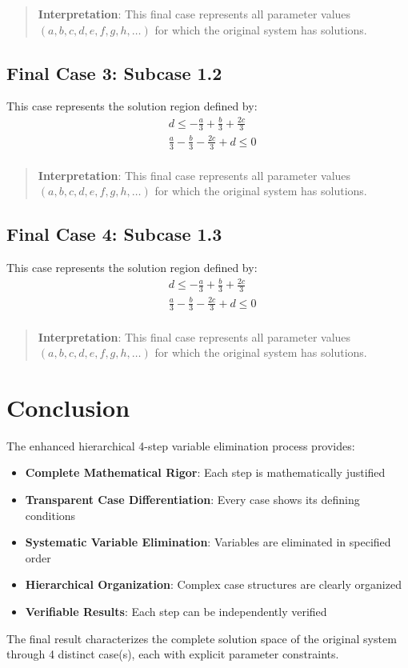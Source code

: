 \documentclass{article}
\newenvironment{stepdetail}
  {\begin{quote}\small\color{blue}}
  {\end{quote}}
\begin{document}
\begin{stepdetail}
\textbf{Interpretation}: This final case represents all parameter values
$(a, b, c, d, e, f, g, h, \ldots)$ for which the original system has solutions.
\end{stepdetail}

\subsection{Final Case 3: Subcase 1.2}

This case represents the solution region defined by:
\begin{align}
& d \leq - \frac{a}{3} + \frac{b}{3} + \frac{2 c}{3} \\
& \frac{a}{3} - \frac{b}{3} - \frac{2 c}{3} + d \leq 0 \\
\end{align}

\begin{stepdetail}
\textbf{Interpretation}: This final case represents all parameter values
$(a, b, c, d, e, f, g, h, \ldots)$ for which the original system has solutions.
\end{stepdetail}

\subsection{Final Case 4: Subcase 1.3}

This case represents the solution region defined by:
\begin{align}
& d \leq - \frac{a}{3} + \frac{b}{3} + \frac{2 c}{3} \\
& \frac{a}{3} - \frac{b}{3} - \frac{2 c}{3} + d \leq 0 \\
\end{align}

\begin{stepdetail}
\textbf{Interpretation}: This final case represents all parameter values
$(a, b, c, d, e, f, g, h, \ldots)$ for which the original system has solutions.
\end{stepdetail}

\section{Conclusion}

The enhanced hierarchical 4-step variable elimination process provides:
\begin{itemize}
\item \textbf{Complete Mathematical Rigor}: Each step is mathematically justified
\item \textbf{Transparent Case Differentiation}: Every case shows its defining conditions
\item \textbf{Systematic Variable Elimination}: Variables are eliminated in specified order
\item \textbf{Hierarchical Organization}: Complex case structures are clearly organized
\item \textbf{Verifiable Results}: Each step can be independently verified
\end{itemize}

The final result characterizes the complete solution space of the original system
through 4 distinct case(s), each with explicit parameter constraints.
\end{document}
